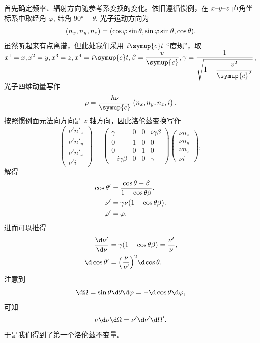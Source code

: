 \documentclass[../天体物理基础.tex]{subfiles}
\begin{document}
首先确定频率、辐射方向随参考系变换的变化。依旧遵循惯例，在 $x\text{\textendash}y\text{\textendash}z$ 直角坐标系中取经角 $\varphi$, 纬角 $\ang{90;;}-\theta$, 光子运动方向为
\begin{equation}
\mleft(n_{x}, n_{y}, n_{z}\mright)=\mleft(\cos{\varphi}\sin{\theta},\sin{\varphi}\sin{\theta},\cos{\theta}\mright).
\end{equation}
虽然听起来有点离谱，但此处我们采用 $i\symup{c}t$ “度规”，取 $x^{1}=x, x^{2}=y, x^{3}=z, x^{4}=i\symup{c}t,\beta=\dfrac{v}{\symup{c}},\gamma=\dfrac{1}{\sqrt{1-\dfrac{v^{2}}{\symup{c}^{2}}}}$, 光子四维动量写作
\begin{equation}
p=\frac{h\nu}{\symup{c}}
\begin{pmatrix}
n_{x}, n_{y}, n_{z}, i
\end{pmatrix}.
\end{equation}
按照惯例面元法向方向是 $z$ 轴方向，因此洛伦兹变换写作
\begin{equation}
\begin{pmatrix}
\nu' n'_{z}\\
\nu' n'_{y}\\
\nu' n'_{x}\\
\nu' i
\end{pmatrix}=
\begin{pmatrix}
\gamma & 0 & 0 & i\gamma\beta\\
0 & 1 & 0 & 0\\
0 & 0 & 1 & 0\\
-i\gamma\beta & 0 & 0 &\gamma
\end{pmatrix}
\begin{pmatrix}
\nu n_{z}\\\nu n_{y}\\\nu n_{x}\\\nu i
\end{pmatrix},
\end{equation}
解得
\begin{align}
\cos{\theta'}&=\frac{\cos{\theta}-\beta}{1-\cos{\theta}\beta}.\\
\nu'&=\gamma\nu\mleft(1-\cos{\theta}\beta\mright).\\
\varphi'&=\varphi.
\end{align}
进而可以推得
\begin{align}
\frac{\d\nu'}{\d\nu}&=\gamma\mleft(1-\cos{\theta}\beta\mright)=\frac{\nu'}{\nu},\\
\d\cos{\theta'}&=\mleft(\frac{\nu}{\nu'}\mright)^{2}\d\cos{\theta}.
\end{align}
注意到
\begin{equation}
\d\Omega=\sin{\theta}\d\theta\d\varphi=-\d\cos{\theta}\d\varphi,
\end{equation}
可知
\begin{equation}
\nu\d\nu\d\Omega=\nu'\d\nu'\d\Omega'.
\end{equation}
于是我们得到了第一个洛伦兹不变量。
\end{document}

